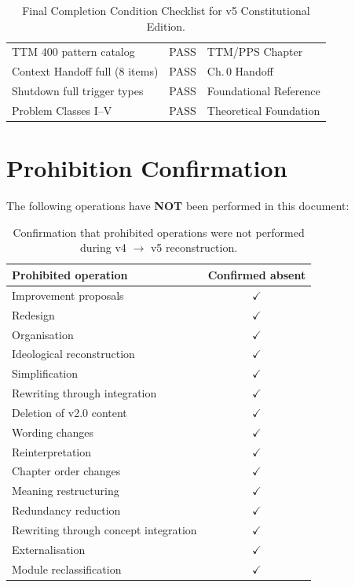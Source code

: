 \begin{table}[ht]
\begin{tabularx}{\linewidth}{Xll}
TTM 400 pattern catalog & PASS & TTM/PPS Chapter \\

Context Handoff full (8 items) & PASS & Ch.\,0 Handoff \\

Shutdown full trigger types & PASS & Foundational Reference \\

Problem Classes I--V & PASS & Theoretical Foundation \\

\bottomrule
\end{tabularx}
\caption[Final completion checklist]{Final Completion Condition
Checklist for v5 Constitutional Edition.}
\label{tab:final-completion-checklist}
\end{table}

\section{Prohibition Confirmation}
\label{sec:final-prohibitions}

The following operations have \textbf{NOT} been performed in this
document:

\begin{table}[ht]
\centering
\small
\begin{tabularx}{0.85\linewidth}{Xc}
\toprule
\textbf{Prohibited operation} & \textbf{Confirmed absent} \\
\midrule
Improvement proposals & $\checkmark$ \\
Redesign & $\checkmark$ \\
Organisation & $\checkmark$ \\
Ideological reconstruction & $\checkmark$ \\
Simplification & $\checkmark$ \\
Rewriting through integration & $\checkmark$ \\
Deletion of v2.0 content & $\checkmark$ \\
Wording changes & $\checkmark$ \\
Reinterpretation & $\checkmark$ \\
Chapter order changes & $\checkmark$ \\
Meaning restructuring & $\checkmark$ \\
Redundancy reduction & $\checkmark$ \\
Rewriting through concept integration & $\checkmark$ \\
Externalisation & $\checkmark$ \\
Module reclassification & $\checkmark$ \\
\bottomrule
\end{tabularx}
\caption[Prohibition confirmation]{Confirmation that prohibited
operations were not performed during v4 $\to$ v5 reconstruction.}
\label{tab:final-prohibitions}
\end{table}

